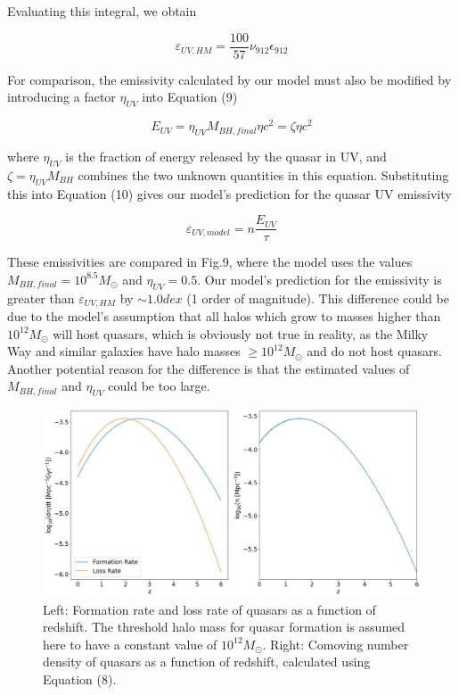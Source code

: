 \documentclass[12pt, twocolumn]{report}%
\begin{document}
\noindent Evaluating this integral, we obtain

\begin{equation}
    \varepsilon_{UV,HM}=\frac{100}{57}\nu_{912}\epsilon_{912}
\end{equation}

For comparison, the emissivity calculated by our model must also be modified by introducing a factor $\eta_{UV}$ into Equation (9)

\begin{equation}
    E_{UV}=\eta_{UV}M_{BH,final}\eta c^2=\zeta\eta c^2
\end{equation}

\noindent where $\eta_{UV}$ is the fraction of energy released by the quasar in UV, and $\zeta=\eta_{UV}M_{BH}$ combines the two unknown quantities in this equation. Substituting this into Equation (10) gives our model's prediction for the quasar UV emissivity

\begin{equation}
    \varepsilon_{UV,model}=n\frac{E_{UV}}{\tau}
\end{equation}

These emissivities are compared in Fig.9, where the model uses the values $M_{BH,final}=10^{8.5}M_\odot$ and $\eta_{UV}=0.5$. Our model's prediction for the emissivity is greater than $\varepsilon_{UV,HM}$ by $\sim1.0dex$ (1 order of magnitude). This difference could be due to the model's assumption that all halos which grow to masses higher than $10^12M_\odot$ will host quasars, which is obviously not true in reality, as the Milky Way and similar galaxies have halo masses $\geq10^{12}M_\odot$ and do not host quasars. Another potential reason for the difference is that the estimated values of $M_{BH,final}$ and $\eta_{UV}$ could be too large.

\clearpage

\onecolumngrid


\begin{figure}[H]
\centering
\includegraphics[width=\linewidth]{Plot_7_2.jpeg}
\caption{Left: Formation rate and loss rate of quasars as a function of redshift. The threshold halo mass for quasar formation is assumed here to have a constant value of $10^{12}M_\odot$. Right: Comoving number density of quasars as a function of redshift, calculated using Equation (8).}
\label{fig:7}
\end{figure}
\end{document}
